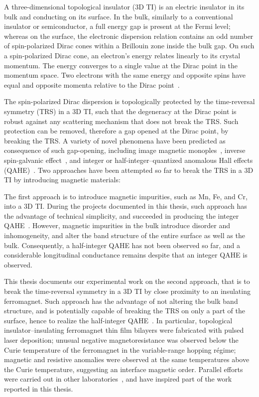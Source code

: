 A three-dimensional topological insulator (3D TI) is an electric insulator in its bulk and conducting on its surface. In the bulk, similarly to a conventional insulator or semiconductor, a full energy gap is present at the Fermi level; whereas on the surface, the electronic dispersion relation contains an odd number of spin-polarized Dirac cones within a Brillouin zone inside the bulk gap. On such a spin-polarized Dirac cone, an electron's energy relates linearly to its crystal momentum. The energy converges to a single value at the Dirac point in the momentum space. Two electrons with the same energy and opposite spins have equal and opposite momenta relative to the Dirac point~\cite{TI_Qi, TI_Col}.

The spin-polarized Dirac dispersion is topologically protected by the time-reversal symmetry (TRS) in a 3D TI, such that the degeneracy at the Dirac point is robust against any scattering mechanism that does not break the TRS. Such protection can be removed, therefore a gap opened at the Dirac point, by breaking the TRS. A variety of novel phenomena have been predicted as consequence of such gap-opening, including image magnetic monoples~\cite{TI_birth, TI_monopole}, inverse spin-galvanic effect~\cite{ISG}, and integer or half-integer--quantized anomalous Hall effects (QAHE)~\cite{TI_Col, QAH_TI_Yu}. Two approaches have been attempted so far to break the TRS in a 3D TI by introducing magnetic materials:

The first approach is to introduce magnetic impurities, such as Mn, Fe, and Cr, into a 3D TI. During the projects documented in this thesis, such approach has the advantage of technical simplicity, and succeeded in producing the integer QAHE~\cite{Chang2013, Kou2014}. However, magnetic impurities in the bulk introduce disorder and inhomogeneity, and alter the band structure of the entire surface as well as the bulk. Consequently, a half-integer QAHE has not been observed so far, and a considerable longitudinal conductance remains despite that an integer QAHE is observed.

This thesis documents our experimental work on the second approach, that is to break the time-reversal symmetry in a 3D TI by close proximity to an insulating ferromagnet. Such approach has the advantage of not altering the bulk band structure, and is potentially capable of breaking the TRS on only a part of the surface, hence to realize the half-integer QAHE~\cite{TI_Col}. In particular, topological insulator--insulating ferromagnet thin film bilayers were fabricated with pulsed laser deposition; unusual negative magnetoresistance was observed below the Curie temperature of the ferromagnet in the variable-range hopping r\'egime; magnetic and resistive anomalies were observed at the same temperatures above the Curie temperature, suggesting an interface magnetic order. Parallel efforts were carried out in other laboratories~\cite{Moodera2013, Samarth2013, Moodera2016}, and have inspired part of the work reported in this thesis.